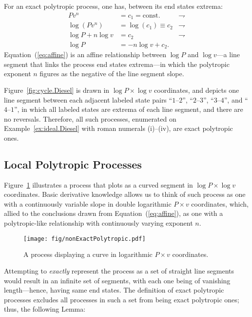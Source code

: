 \documentclass[fleqn,11pt]{SelfArx}
\begin{document}
    For an exact polytropic process, one has, between its end states extrema:%
    \begin{align}
        Pv^n & = c_1 = \text{const.}        & \rightharpoondown\\
        \log(Pv^n) & = \log(c_1) \equiv c_2 & \rightharpoondown\\
        \log P + n\log v & = c_2            & \rightharpoondown\\
        \log P & = -n\log v + c_2. \label{eq:affine}
    \end{align}
    Equation~(\ref{eq:affine}) is an affine relationship between $\log P$ and $\log v$---a  line
    segment that links the process end states extrema---in which  the  polytropic  exponent  $n$
    figures as the negative of the line segment slope.

    Figure~\ref{fig:cycle.Diesel} is drawn in $\log P \times \log v$  coordinates,  and  depicts
    one line segment between each  adjacent  labeled  state  pairs  ``$1$--$2$'',  ``$2$--$3$'',
    ``$3$--$4$'', and ``$4$--$1$'', in which  all  labeled  states  are  extrema  of  each  line
    segment,  and  there  are  no  reversals.  Therefore,  all  such  processes,  enumerated  on
    Example~\ref{ex:ideal.Diesel} with roman numerals (i)--(iv), are exact polytropic ones.

    \subsection{Local Polytropic Processes}

    Figure~\ref{fig:non.exact} illustrates a process that plots as a curved segment in  $\log  P
    \times \log v$ coordinates. Basic derivative knowledge allows us to think of such process as
    one with a continuously variable slope in double logarithmic $P\times v$ coordinates, which,
    allied  to  the  conclusions  drawn  from  Equation~(\ref{eq:affine}),   as   one   with   a
    polytropic-like relationship with continuously varying exponent $n$.

    \begin{figure}[ht]
        \centering
        \texttt{[image: fig/nonExactPolytropic.pdf]}
        \caption{A process displaying a curve in logarithmic $P\times v$ coordinates.}
        \label{fig:non.exact}
    \end{figure}

    Attempting to \emph{exactly} represent the process as a set of straight line segments  would
    result in an infinite set of segments, with each  one  being  of  vanishing  length---hence,
    having same end states. The definition of exact polytropic processes excludes all  processes
    in such a set from being exact polytropic ones; thus, the following Lemma:
\end{document}

